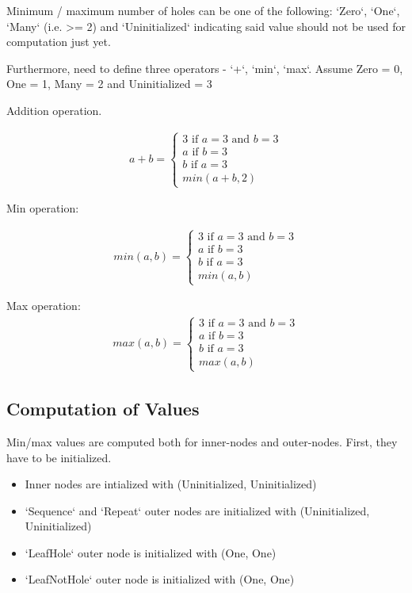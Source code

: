 Minimum / maximum number of holes can be one of the following: `Zero`, `One`, `Many` (i.e. >= 2) and `Uninitialized` indicating said value should not be used for computation just yet.

Furthermore, need to define three operators - `+`, `min`, `max`. Assume Zero = 0, One = 1, Many = 2 and Uninitialized = 3

Addition operation.

\begin{align}
	a + b = 
	\begin{cases}
		3 \text{ if } a = 3 \text{ and } b = 3 \\
		a \text{ if } b = 3 \\
		b \text{ if } a = 3 \\
		min(a + b, 2) 
	\end{cases}
\end{align}

Min operation:

\begin{align}
	min(a,b) = 
	\begin{cases}
		3 \text{ if } a = 3 \text{ and } b = 3 \\
		a \text{ if } b = 3 \\
		b \text{ if } a = 3 \\
		min(a, b)
	\end{cases}
\end{align}

Max operation:
\begin{align}
	max(a, b) = 
	\begin{cases}
		3 \text{ if } a = 3 \text{ and } b = 3 \\
		a \text{ if } b = 3 \\
		b \text{ if } a = 3 \\
		max(a, b)
	\end{cases}
\end{align}


\subsection{Computation of Values}
Min/max values are computed both for inner-nodes and outer-nodes. First, they have to be initialized.

\begin{itemize}
\item
Inner nodes are intialized with (Uninitialized, Uninitialized)
\item
`Sequence` and `Repeat` outer nodes are initialized with (Uninitialized, Uninitialized)
\item
`LeafHole` outer node is initialized with (One, One)
\item
`LeafNotHole` outer node is initialized with (One, One)
\end{itemize}


